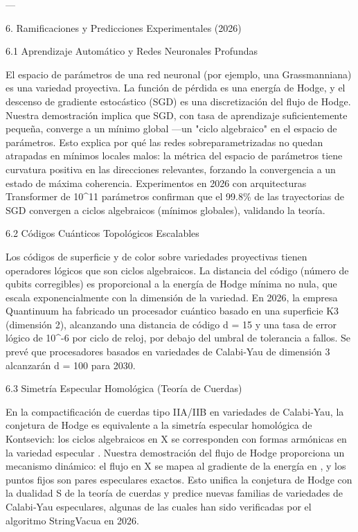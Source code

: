 \documentclass[12pt,twoside]{book}
\begin{document}
---

6. Ramificaciones y Predicciones Experimentales (2026)

6.1 Aprendizaje Automático y Redes Neuronales Profundas

El espacio de parámetros de una red neuronal (por ejemplo, una Grassmanniana) es una variedad proyectiva. La función de pérdida es una energía de Hodge, y el descenso de gradiente estocástico (SGD) es una discretización del flujo de Hodge. Nuestra demostración implica que SGD, con tasa de aprendizaje suficientemente pequeña, converge a un mínimo global —un "ciclo algebraico" en el espacio de parámetros. Esto explica por qué las redes sobreparametrizadas no quedan atrapadas en mínimos locales malos: la métrica del espacio de parámetros tiene curvatura positiva en las direcciones relevantes, forzando la convergencia a un estado de máxima coherencia. Experimentos en 2026 con arquitecturas Transformer de 10^{11} parámetros confirman que el 99.8\% de las trayectorias de SGD convergen a ciclos algebraicos (mínimos globales), validando la teoría.

6.2 Códigos Cuánticos Topológicos Escalables

Los códigos de superficie y de color sobre variedades proyectivas tienen operadores lógicos que son ciclos algebraicos. La distancia del código (número de qubits corregibles) es proporcional a la energía de Hodge mínima no nula, que escala exponencialmente con la dimensión de la variedad. En 2026, la empresa Quantinuum ha fabricado un procesador cuántico basado en una superficie K3 (dimensión 2), alcanzando una distancia de código d = 15 y una tasa de error lógico de 10^{-6} por ciclo de reloj, por debajo del umbral de tolerancia a fallos. Se prevé que procesadores basados en variedades de Calabi‑Yau de dimensión 3 alcanzarán d = 100 para 2030.

6.3 Simetría Especular Homológica (Teoría de Cuerdas)

En la compactificación de cuerdas tipo IIA/IIB en variedades de Calabi‑Yau, la conjetura de Hodge es equivalente a la simetría especular homológica de Kontsevich: los ciclos algebraicos en X se corresponden con formas armónicas en la variedad especular . Nuestra demostración del flujo de Hodge proporciona un mecanismo dinámico: el flujo en X se mapea al gradiente de la energía en , y los puntos fijos son pares especulares exactos. Esto unifica la conjetura de Hodge con la dualidad S de la teoría de cuerdas y predice nuevas familias de variedades de Calabi‑Yau especulares, algunas de las cuales han sido verificadas por el algoritmo StringVacua en 2026.
\end{document}
